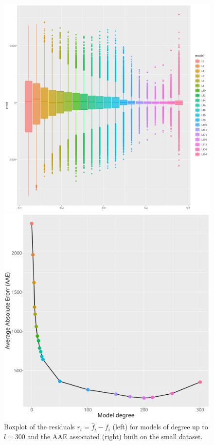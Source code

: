 \documentclass[a4paper]{article}
\theoremstyle{definition}
\begin{document}
\begin{figure}[h!]
\begin{minipage}{.45\textwidth}
    \centering
        \includegraphics[width=0.9\linewidth]{media/small_error_box.png}
\end{minipage}
\begin{minipage}{.45\textwidth}
    \centering
        \includegraphics[width=0.9\linewidth]{media/small_err.png}
\end{minipage}
\caption{Boxplot of the residuals $r_i = \hat f_i - f_i$ (left) for models of degree up to $l = 300$ and the AAE associated (right)
built on the small dataset.}
\end{figure}
\end{document}
